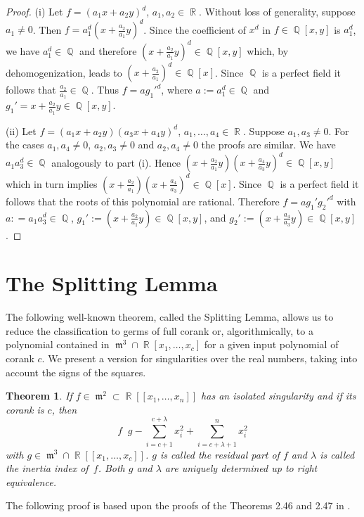 \documentclass[noend]{amsproc}
\newtheorem{theorem}{Theorem}
\DeclareMathOperator{\requiv}{\overset{r}{\sim}}
\DeclareMathOperator{\m}{\mathfrak{m}}
\DeclareMathOperator{\Q}{\mathbb{Q}}
\DeclareMathOperator{\R}{\mathbb{R}}
\begin{document}
\begin{proof}

(i) Let $f = (a_1x+a_2y)^d$, $a_1, a_2 \in \R$. Without loss of generality,
suppose $a_1 \neq 0$. Then $f = a_1^d(x+\frac{a_2}{a_1}y)^d$. Since the
coefficient of $x^d$ in $f \in \Q[x,y]$ is $a_1^d$, we have $a_1^d \in \Q$ and
therefore $(x+\frac{a_2}{a_1}y)^d \in \Q[x,y]$ which, by dehomogenization,
leads to $(x+\frac{a_2}{a_1})^d \in \Q[x]$. Since $\Q$ is a perfect field it
follows that $\frac{a_2}{a_1} \in \Q$. Thus $f = ag_1'^d$, where
$a := a_1^d \in \Q$ and $g_1' = x+\frac{a_2}{a_1}y \in \Q[x,y]$.

(ii) Let $f = (a_1x+a_2y)(a_3x+a_4y)^d$, $a_1,\ldots,a_4 \in \R$. Suppose
$a_1,a_3 \neq 0$. For the cases $a_1,a_4 \neq 0$, $a_2,a_3 \neq 0$ and
$a_2,a_4 \neq 0$ the proofs are similar. We have $a_1a_3^d \in \Q$ analogously
to part (i). Hence $(x+\frac{a_2}{a_1}y)(x+\frac{a_4}{a_3}y)^d \in \Q[x,y]$
which in turn implies $(x+\frac{a_2}{a_1})(x+\frac{a_4}{a_3})^d \in \Q[x]$.
Since $\Q$ is a perfect field it follows that the roots of this polynomial are
rational. Therefore $f = ag_1'g_2'^d$ with $a: = a_1a_3^d \in \Q$,
$g_1' := (x+\frac{a_2}{a_1}y) \in \Q[x,y]$, and
$g_2' := (x+\frac{a_4}{a_3}y) \in \Q[x,y]$.
\end{proof}


\section{The Splitting Lemma}\label{TheSplittingLemma}

The following well-known theorem, called the Splitting Lemma, allows us to
reduce the classification to germs of full corank or, algorithmically, to
a polynomial contained in $\m^3 \cap \R[x_1,\ldots,x_c]$ for a given input
polynomial of corank $c$. We present a version for singularities over the real
numbers, taking into account the signs of the squares.

\begin{theorem}\label{SplittingLemma}
If $f \in \m^2 \subset \R[[x_1,\ldots,x_n]]$ has an isolated singularity and if
its corank is $c$, then
\[
f \requiv g -\sum_{i=c+1}^{c+\lambda} x_i^2 +\sum_{i=c+\lambda+1}^n x_i^2
\]
with $g \in \m^3 \cap \R[[x_1,\ldots,x_c]]$. $g$ is called the residual part of
$f$ and $\lambda$ is called the inertia index of~$f$. Both $g$ and $\lambda$
are uniquely determined up to right equivalence.
\end{theorem}

The following proof is based upon the proofs of the Theorems 2.46 and 2.47 in
\cite{GLS2007}.
\end{document}
